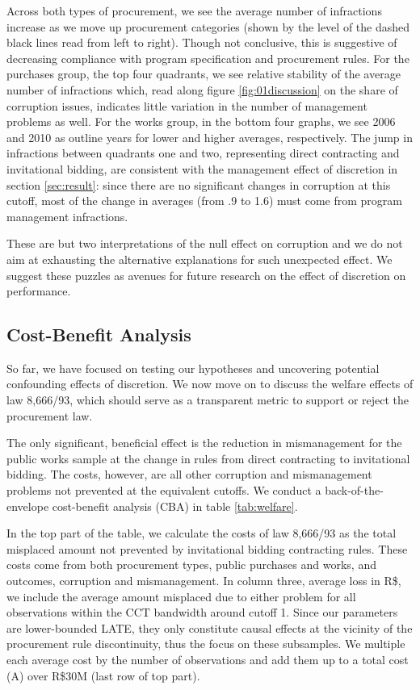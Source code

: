 \documentclass[11pt]{article}
\begin{document}
Across both types of procurement, we see the average number of infractions increase as we move up procurement categories (shown by the level of the dashed black lines read from left to right). Though not conclusive, this is suggestive of decreasing compliance with program specification and procurement rules. For the purchases group, the top four quadrants, we see relative stability of the average number of infractions which, read along figure \ref{fig:01discussion} on the share of corruption issues, indicates little variation in the number of management problems as well. For the works group, in the bottom four graphs, we see 2006 and 2010 as outline years for lower and higher averages, respectively. The jump in infractions between quadrants one and two, representing direct contracting and invitational bidding, are consistent with the management effect of discretion in section \ref{sec:result}: since there are no significant changes in corruption at this cutoff, most of the change in averages (from .9 to 1.6) must come from program management infractions.

These are but two interpretations of the null effect on corruption and we do not aim at exhausting the alternative explanations for such unexpected effect. We suggest these puzzles as avenues for future research on the effect of discretion on performance.

\subsection{Cost-Benefit Analysis} \label{subsec:cba}

So far, we have focused on testing our hypotheses and uncovering potential confounding effects of discretion. We now move on to discuss the welfare effects of law 8,666/93, which should serve as a transparent metric to support or reject the procurement law.

The only significant, beneficial effect is the reduction in mismanagement for the public works sample at the change in rules from direct contracting to invitational bidding. The costs, however, are all other corruption and mismanagement problems not prevented at the equivalent cutoffs. We conduct a back-of-the-envelope cost-benefit analysis (CBA) in table \ref{tab:welfare}.



In the top part of the table, we calculate the costs of law 8,666/93 as the total misplaced amount not prevented by invitational bidding contracting rules. These costs come from both procurement types, public purchases and works, and outcomes, corruption and mismanagement. In column three, average loss in R\$, we include the average amount misplaced due to either problem for all observations within the CCT bandwidth around cutoff 1. Since our parameters are lower-bounded LATE, they only constitute causal effects at the vicinity of the procurement rule discontinuity, thus the focus on these subsamples. We multiple each average cost by the number of observations and add them up to a total cost (A) over R\$30M (last row of top part).
\end{document}
